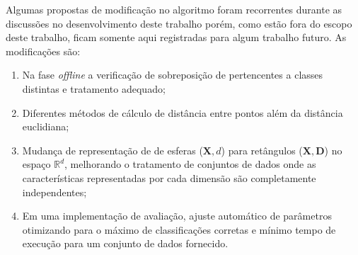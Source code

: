Algumas propostas de modificação no algoritmo \minas foram recorrentes durante
as discussões no desenvolvimento deste trabalho porém, como estão fora do escopo
deste trabalho, ficam somente aqui registradas para algum trabalho futuro.
As modificações são:

\begin{enumerate}[label={\alph*)}]

  \item Na fase \emph{offline} a verificação de sobreposição de \clusters
  pertencentes a classes distintas e tratamento adequado;
  
  \item Diferentes métodos de cálculo de distância entre pontos além da
  distância euclidiana;
  
  \item Mudança de representação de \clusters de esferas ($\mathbf{X}, d$) para
  retângulos ($\mathbf{X}, \mathbf{D}$) no espaço $\mathbb{R}^d$, melhorando o
  tratamento de conjuntos de dados onde as características representadas por
  cada dimensão são completamente independentes;
  
  

  \item Em uma implementação de avaliação, ajuste automático de parâmetros
  otimizando para o máximo de classificações corretas e mínimo tempo de execução
  para um conjunto de dados fornecido.

\end{enumerate}
